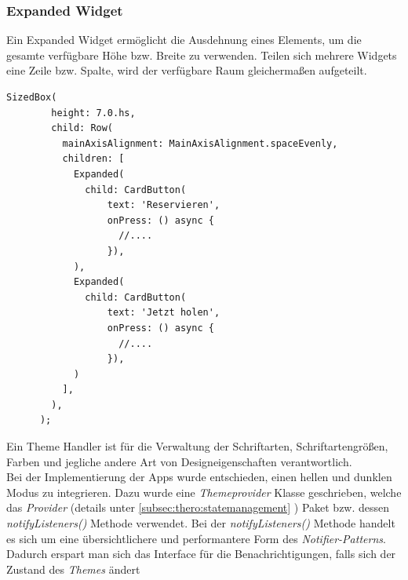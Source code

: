 \newpage
\subsubsection{Expanded Widget}
 Ein Expanded Widget ermöglicht die Ausdehnung eines Elements, um die gesamte verfügbare Höhe bzw. Breite zu verwenden. Teilen sich mehrere Widgets eine Zeile bzw. Spalte, wird der verfügbare Raum gleichermaßen aufgeteilt.
\begin{lstlisting}[caption=Eine Reihe mit zwei gleich breiten Buttons,style=goMono]
SizedBox(
        height: 7.0.hs,
        child: Row(
          mainAxisAlignment: MainAxisAlignment.spaceEvenly,
          children: [
            Expanded(
              child: CardButton(
                  text: 'Reservieren',
                  onPress: () async {
                    //....
                  }),
            ),
            Expanded(
              child: CardButton(
                  text: 'Jetzt holen',
                  onPress: () async {
                    //....
                  }),
            )
          ],
        ),
      );
\end{lstlisting}

\label{subsec:impl:themehandler}
Ein Theme Handler ist für die Verwaltung der Schriftarten, Schriftartengrößen, Farben und jegliche andere Art von Designeigenschaften verantwortlich. \\
Bei der Implementierung der Apps wurde entschieden, einen hellen und dunklen Modus zu integrieren. Dazu wurde eine {\textit{Themeprovider}} Klasse geschrieben, welche das {\textit{Provider}} (details unter \ref{subsec:thero:statemanagement} ) Paket bzw. dessen {\textit{notifyListeners()}} Methode verwendet. Bei der {\textit{notifyListeners()}} Methode handelt es sich um eine übersichtlichere und performantere Form des {\textit{Notifier-Patterns}}. Dadurch erspart man sich das Interface für die Benachrichtigungen, falls sich der Zustand des {\textit{Themes}} ändert

\newpage


